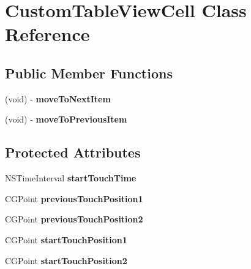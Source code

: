 \hypertarget{interface_custom_table_view_cell}{
\section{CustomTableViewCell Class Reference}
\label{interface_custom_table_view_cell}
}
\subsection*{Public Member Functions}
\begin{DoxyCompactItemize}
\item 
\hypertarget{interface_custom_table_view_cell_a55906d21ca12c006ee9b6b902acc21c0}{
(void) -\/ {\bfseries moveToNextItem}}
\label{interface_custom_table_view_cell_a55906d21ca12c006ee9b6b902acc21c0}

\item 
\hypertarget{interface_custom_table_view_cell_a7665d044ddf4b9c958a55ccb72774bbc}{
(void) -\/ {\bfseries moveToPreviousItem}}
\label{interface_custom_table_view_cell_a7665d044ddf4b9c958a55ccb72774bbc}

\end{DoxyCompactItemize}
\subsection*{Protected Attributes}
\begin{DoxyCompactItemize}
\item 
\hypertarget{interface_custom_table_view_cell_a19282423135c90663b7dac45884d19c7}{
NSTimeInterval {\bfseries startTouchTime}}
\label{interface_custom_table_view_cell_a19282423135c90663b7dac45884d19c7}

\item 
\hypertarget{interface_custom_table_view_cell_aee78f952647e67e4fb090454950f1517}{
CGPoint {\bfseries previousTouchPosition1}}
\label{interface_custom_table_view_cell_aee78f952647e67e4fb090454950f1517}

\item 
\hypertarget{interface_custom_table_view_cell_aabdc4b303157dbdf2ab08aa440136cbf}{
CGPoint {\bfseries previousTouchPosition2}}
\label{interface_custom_table_view_cell_aabdc4b303157dbdf2ab08aa440136cbf}

\item 
\hypertarget{interface_custom_table_view_cell_a28bd87197dfae7b366e6bb278906ce71}{
CGPoint {\bfseries startTouchPosition1}}
\label{interface_custom_table_view_cell_a28bd87197dfae7b366e6bb278906ce71}

\item 
\hypertarget{interface_custom_table_view_cell_a35842ab141221748a1f0ca0b53f07a7f}{
CGPoint {\bfseries startTouchPosition2}}
\label{interface_custom_table_view_cell_a35842ab141221748a1f0ca0b53f07a7f}

\end{DoxyCompactItemize}

